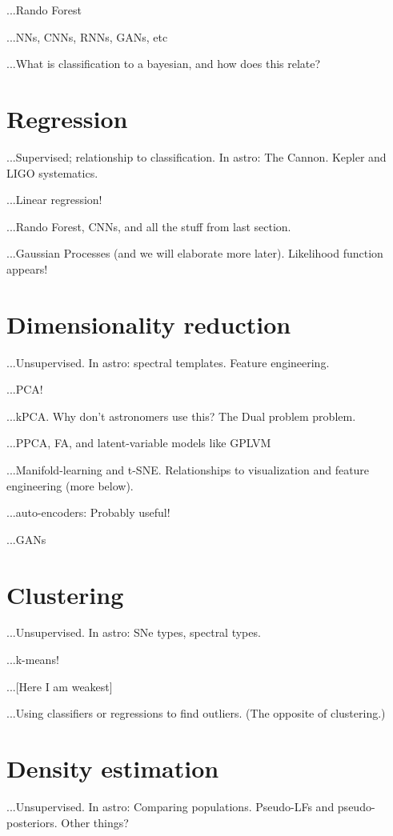 \documentclass[12pt, letterpaper]{article}
\begin{document}
...Rando Forest

...NNs, CNNs, RNNs, GANs, etc

...What is classification to a bayesian, and how does this relate?

\section{Regression}

...Supervised; relationship to classification. In astro: The Cannon. Kepler and LIGO systematics.

...Linear regression!

...Rando Forest, CNNs, and all the stuff from last section.

...Gaussian Processes (and we will elaborate more later). Likelihood function appears!

\section{Dimensionality reduction}

...Unsupervised. In astro: spectral templates. Feature engineering.

...PCA!

...kPCA. Why don't astronomers use this? The Dual problem problem.

...PPCA, FA, and latent-variable models like GPLVM

...Manifold-learning and t-SNE. Relationships to visualization and feature engineering (more below).

...auto-encoders: Probably useful!

...GANs

\section{Clustering}

...Unsupervised. In astro: SNe types, spectral types.

...k-means!

...[Here I am weakest]

...Using classifiers or regressions to find outliers. (The opposite of clustering.)

\section{Density estimation}

...Unsupervised. In astro: Comparing populations. Pseudo-LFs and pseudo-posteriors. Other things?
\end{document}
